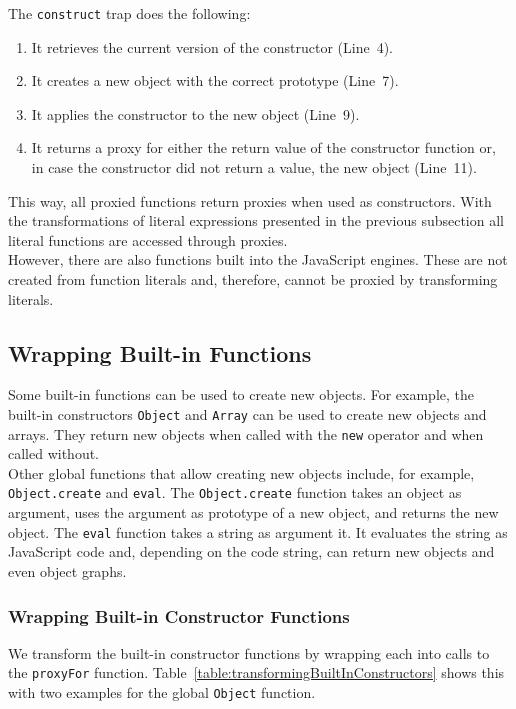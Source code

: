 The \lstinline{construct} trap does the following:
\begin{enumerate}
    \item It retrieves the current version of the constructor (Line~4).
    \item It creates a new object with the correct prototype (Line~7).
    \item It applies the constructor to the new object (Line~9).
    \item It returns a proxy for either the return value of the constructor function or, in case the constructor did not return a value, the new object (Line~11).
\end{enumerate}

This way, all proxied functions return proxies when used as constructors.
With the transformations of literal expressions presented in the previous subsection all literal functions are accessed through proxies.\\
However, there are also functions built into the JavaScript engines.
These are not created from function literals and, therefore, cannot be proxied by transforming literals.


\subsection{Wrapping Built-in Functions}

Some built-in functions can be used to create new objects.
For example, the built-in constructors \lstinline{Object} and \lstinline{Array} can be used to create new objects and arrays.
They return new objects when called with the \lstinline{new} operator and when called without.\\
Other global functions that allow creating new objects include, for example, \lstinline{Object.create} and \lstinline{eval}.
The \lstinline{Object.create} function takes an object as argument, uses the argument as prototype of a new object, and returns the new object.
The \lstinline{eval} function takes a string as argument it.
It evaluates the string as JavaScript code and, depending on the code string, can return new objects and even object graphs.


\subsubsection{Wrapping Built-in Constructor Functions}

We transform the built-in constructor functions by wrapping each into calls to the \lstinline{proxyFor} function.
Table~\ref{table:transformingBuiltInConstructors} shows this with two examples for the global \lstinline{Object} function.

